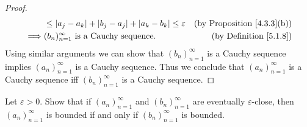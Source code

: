 \begin{proof}
\begin{align*}
                 & \leq \abs*{a_j - a_k} + \abs*{b_j - a_j} + \abs*{a_k - b_k} \leq \varepsilon             & \text{(by Proposition \ref{4.3.3}(b))}    \\
        \implies & (b_n)_{n = 1}^\infty \text{ is a Cauchy sequence}.                                       & \text{(by Definition \ref{5.1.8})}
    \end{align*}
    Using similar arguments we can show that \((b_n)_{n = 1}^\infty\) is a Cauchy sequence implies \((a_n)_{n = 1}^\infty\) is a Cauchy sequence.
    Thus we conclude that \((a_n)_{n = 1}^\infty\) is a Cauchy sequence iff \((b_n)_{n = 1}^\infty\) is a Cauchy sequence.
\end{proof}

\begin{exercise}\label{ex 5.2.2}
    Let \(\varepsilon > 0\).
    Show that if \((a_n)_{n = 1}^{\infty}\) and \((b_n)_{n = 1}^{\infty}\) are eventually \(\varepsilon\)-close, then \((a_n)_{n = 1}^{\infty}\) is bounded if and only if \((b_n)_{n = 1}^{\infty}\) is bounded.
\end{exercise}


